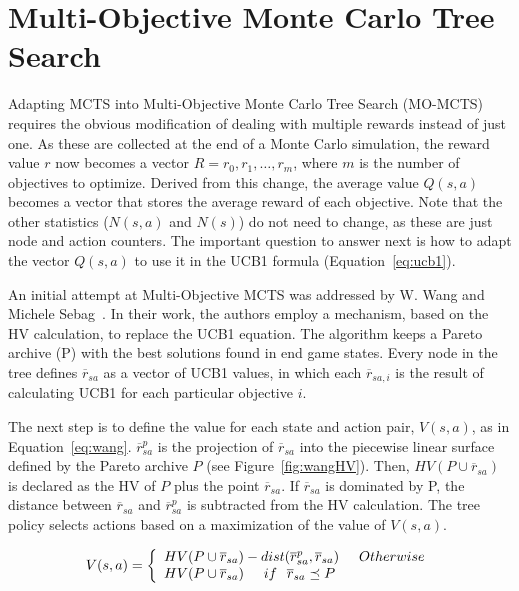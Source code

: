 \documentclass[journal]{IEEEtran}
\begin{document}
\section{Multi-Objective Monte Carlo Tree Search} \label{sec:momcts}

Adapting MCTS into Multi-Objective Monte Carlo Tree Search (MO-MCTS) requires the obvious modification of dealing with multiple rewards instead of just one. As these are collected at the end of a Monte Carlo simulation, the reward value $r$ now becomes a vector $R = {r_0, r_1, \dots, r_m}$, where $m$ is the number of objectives to optimize. Derived from this change, the average value $Q(s,a)$ becomes a vector that stores the average reward of each objective. Note that the other statistics ($N(s,a)$ and $N(s)$) do not need to change, as these are just node and action counters. The important question to answer next is how to adapt the vector $Q(s,a)$ to use it in the UCB1 formula (Equation~\ref{eq:ucb1}). 

An initial attempt at Multi-Objective MCTS was addressed by W. Wang and Michele Sebag~\cite{Weijia2012, Weijia2013}. In their work, the authors employ a mechanism, based on the HV calculation, to replace the UCB1 equation. The algorithm keeps a Pareto archive (P) with the best solutions found in end game states. Every node in the tree defines $\overline{r}_{sa}$ as a vector of UCB1 values, in which each $\overline{r}_{sa, i}$ is the result of calculating UCB1 for each particular objective $i$.

The next step is to define the value for each state and action pair, $V(s,a)$, as in Equation~\ref{eq:wang}. $\overline{r}^p_{sa}$ is the projection of $\overline{r}_{sa}$ into the piecewise linear surface defined by the Pareto archive $P$ (see Figure~\ref{fig:wangHV}). Then, $HV(P \cup \overline{r}_{sa})$ is declared as the HV of $P$ plus the point $\overline{r}_{sa}$. If $\overline{r}_{sa}$ is dominated by P, the distance between $\overline{r}_{sa}$ and $\overline{r}^p_{sa}$ is subtracted from the HV calculation. The tree policy selects actions based on a maximization of the value of $V(s,a)$.

\begin{equation} \label{eq:wang}
	V(s,a) = \left\{
\begin{array}{l l}      
    HV(P \cup \overline{r}_{sa}) - dist(\overline{r}^p_{sa}, \overline{r}_{sa} )\hspace{0.5cm} Otherwise \\
    HV(P \cup \overline{r}_{sa}) \hspace{0.5cm} if \hspace{0.25cm} \overline{r}_{sa} \preceq P\\
\end{array}\right.
\end{equation}
\end{document}
